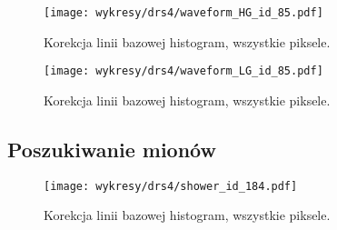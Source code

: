 \documentclass[a4paper,11pt,twoside]{article}
\begin{document}
\begin{figure}[H] 
\centering
\texttt{[image: wykresy/drs4/waveform\_HG\_id\_85.pdf]}
\caption{Korekcja linii bazowej histogram, wszystkie piksele.}
\label{fig:muon_image}
\end{figure}

\begin{figure}[H] 
\centering
\texttt{[image: wykresy/drs4/waveform\_LG\_id\_85.pdf]}
\caption{Korekcja linii bazowej histogram, wszystkie piksele.}
\label{fig:muon_image}
\end{figure}

\subsection{Poszukiwanie mionów}
\begin{figure}[H] 
\centering
\texttt{[image: wykresy/drs4/shower\_id\_184.pdf]}
\caption{Korekcja linii bazowej histogram, wszystkie piksele.}
\label{fig:muon_image}
\end{figure}
\end{document}
